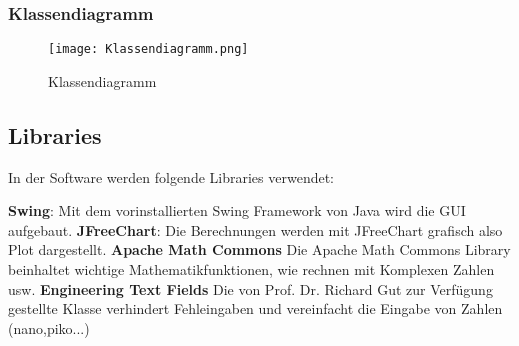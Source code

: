 \newpage

\subsubsection{Klassendiagramm} \label{subsubsec:Klassendiagramm}

\begin{figure}[H]
	\centering
	\texttt{[image: Klassendiagramm.png]}
	\caption{Klassendiagramm}
	\label{fig:Klassendiagramm}
\end{figure} 

\newpage


\subsection{Libraries} \label{subsec:Libraries}

In der Software werden folgende Libraries verwendet:

\textbf{Swing}: Mit dem vorinstallierten Swing Framework von Java wird die GUI aufgebaut.
\textbf{JFreeChart}: Die Berechnungen werden mit JFreeChart grafisch also Plot dargestellt. \cite{jfreechart}
\textbf{Apache Math Commons} Die Apache Math Commons Library beinhaltet wichtige Mathematikfunktionen, wie rechnen mit Komplexen Zahlen usw. \cite{apache}
\textbf{Engineering Text Fields} Die von Prof. Dr. Richard Gut zur Verfügung gestellte Klasse verhindert Fehleingaben und vereinfacht die Eingabe von Zahlen (nano,piko...)

\newpage